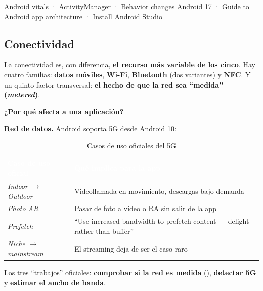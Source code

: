 \begin{fuentesbox}
\href{https://developer.android.com/topic/performance/vitals}{Android vitals} ·
\href{https://developer.android.com/reference/android/app/ActivityManager}{ActivityManager} ·
\href{https://developer.android.com/about/versions/17/behavior-changes-all}{Behavior changes Android 17} ·
\href{https://developer.android.com/topic/libraries/architecture}{Guide to Android app architecture} ·
\href{https://developer.android.com/studio/install}{Install Android Studio}
\end{fuentesbox}

\subsection{Conectividad}

La conectividad es, con diferencia, \textbf{el recurso más variable de los cinco}. Hay cuatro familias: \textbf{datos móviles}, \textbf{Wi-Fi}, \textbf{Bluetooth} (dos variantes) y \textbf{NFC}. Y un quinto factor transversal: \textbf{el hecho de que la red sea \enquote{medida} (\emph{metered})}.

\textbf{\color{primary}¿Por qué afecta a una aplicación?}

\textbf{Red de datos.} Android soporta 5G desde Android 10:

\begin{table}[htbp]
\centering
\small
\begin{tabularx}{\textwidth}{@{}>{\RaggedRight\arraybackslash}p{4.5cm} >{\RaggedRight\arraybackslash}X@{}}
\toprule
\rowcolor{primary}
\textcolor{white}{\sffamily\bfseries Caso de uso oficial} & \textcolor{white}{\sffamily\bfseries Qué implica para la app} \\
\midrule
\emph{Indoor $\to$ Outdoor} & Videollamada en movimiento, descargas bajo demanda \\
\rowcolor{soft}
\emph{Photo AR} & Pasar de foto a vídeo o RA sin salir de la app \\
\emph{Prefetch} & \enquote{Use increased bandwidth to prefetch content --- delight rather than buffer} \\
\rowcolor{soft}
\emph{Niche $\to$ mainstream} & El streaming deja de ser el caso raro \\
\bottomrule
\end{tabularx}
\caption{Casos de uso oficiales del 5G}
\end{table}

Los tres \enquote{trabajos} oficiales: \textbf{comprobar si la red es medida} (), \textbf{detectar 5G} y \textbf{estimar el ancho de banda}.

